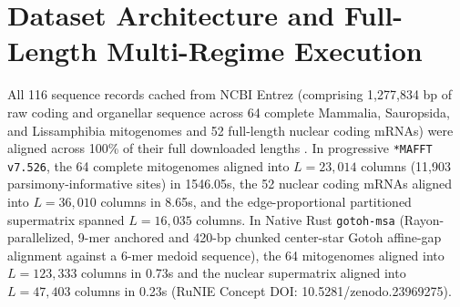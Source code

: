 \documentclass[10pt,letterpaper]{article}
\begin{document}
\section{Dataset Architecture and Full-Length Multi-Regime Execution}
All 116 sequence records cached from NCBI Entrez (comprising 1,277,834 bp of raw coding and organellar sequence across 64 complete Mammalia, Sauropsida, and Lissamphibia mitogenomes and 52 full-length nuclear coding mRNAs) were aligned across 100\% of their full downloaded lengths \cite{white2026runie,meredith2011impacts,alvarez2022species,foley2023genomic}. In progressive \texttt{*MAFFT v7.526}, the 64 complete mitogenomes aligned into $L = 23,014$ columns (11,903 parsimony-informative sites) in 1546.05s, the 52 nuclear coding mRNAs aligned into $L = 36,010$ columns in 8.65s, and the edge-proportional partitioned supermatrix spanned $L = 16,035$ columns. In Native Rust \texttt{gotoh-msa} (Rayon-parallelized, 9-mer anchored and 420-bp chunked center-star Gotoh affine-gap alignment against a 6-mer medoid sequence), the 64 mitogenomes aligned into $L = 123,333$ columns in 0.73s and the nuclear supermatrix aligned into $L = 47,403$ columns in 0.23s (RuNIE Concept DOI: 10.5281/zenodo.23969275).
\end{document}
